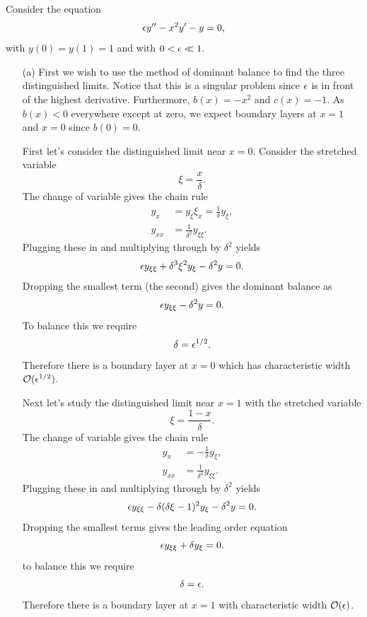\documentclass[12pt]{report}
\begin{document}
\begin{solution}
    
    \noindent
    Consider the equation
    \[ 
        {\epsilon} y'' - x^2 y' - y = 0,
    \]
    with $y(0) = y(1) = 1$ and with $0 < {\epsilon} \ll 1.$
\begin{enumerate}
    \item [(a)] 
    First we wish to use the method of dominant balance to find the three distinguished limits. Notice that this is a singular problem since ${\epsilon}$ is in front of the highest derivative. Furthermore, $b(x) = -x^2$ and $c(x) = - 1$. As $b(x) < 0$ everywhere except at zero, we expect boundary layers at $x = 1$ and $x = 0$ since $b(0) = 0$. 

    \noindent
    First let's consider the distinguished limit near $x=0$. Consider the stretched variable
    \[ 
        \xi = \frac{x}{\delta}.
    \] 
    The change of variable gives the chain rule
    \begin{align*}
        y_x &= y_\xi \xi_x = \frac{1}{\delta}y_\xi,\\
        y_{xx} &= \frac{1}{\delta^2}y_{\xi \xi}. 
    \end{align*}
    Plugging these in and multiplying through by $\delta^2$ yields
    \[ 
        {\epsilon} y_{\xi\xi} + \delta^3 \xi^2 y_{\xi} - \delta^2 y = 0.
    \]
    Dropping the smallest term (the second) gives the dominant balance as
    \[ 
        {\epsilon} y_{\xi \xi} - \delta^2 y = 0.
    \]
    To balance this we require
    \[ 
        \delta = {\epsilon}^{1/2}.
    \]
    Therefore there is a boundary layer at $x = 0$ which has characteristic width ${\mathcal{O}}({\epsilon}^{1/2}).$

    \noindent
    Next let's study the distinguished limit near $x = 1$ with the stretched variable 
    \[ 
        \xi = \frac{1 - x}{\delta}.
    \]
    The change of variable gives the chain rule
    \begin{align*}
        y_x &= -\frac{1}{\delta}y_{\xi},\\
        y_{xx} &= \frac{1}{\delta^2}y_{\xi \xi}.
    \end{align*}
    Plugging these in and multiplying through by $\delta^2$ yields
    \[ 
        {\epsilon} y_{\xi \xi} - \delta(\delta\xi - 1)^2y_\xi - \delta^2 y = 0.
    \]
    Dropping the smallest terms gives the leading order equation
    \[ 
        {\epsilon} y_{\xi \xi} + \delta y_{\xi} = 0.
    \]
    to balance this we require
    \[ 
        \delta = {\epsilon}.
    \]
    Therefore there is a boundary layer at $x = 1$ with characteristic width ${\mathcal{O}}({\epsilon})$. 
    



\end{enumerate}
\end{solution}
\end{document}
